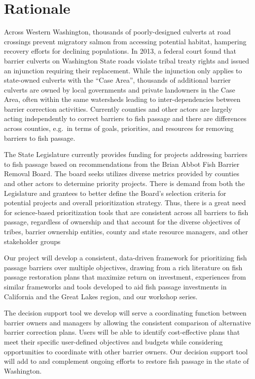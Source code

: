 \documentclass[12pt]{elsarticle}
\begin{document}
		\section{Rationale}
			Across Western Washington, thousands of poorly-designed culverts at road crossings prevent migratory salmon from accessing potential habitat, hampering recovery efforts for declining populations. In 2013, a federal court found that barrier culverts on Washington State roads violate tribal treaty rights and issued an injunction requiring their replacement. While the injunction only applies to state-owned culverts with the ``Case Area'', thousands of additional barrier culverts are owned by local governments and private landowners in the Case Area, often within the same watersheds leading to inter-dependencies between barrier correction activities. Currently counties and other actors are largely acting independently to correct barriers to fish passage and there are differences across counties, e.g.\, in terms of goals, priorities, and resources for removing barriers to fish passage. 
			
			The State Legislature currently provides funding for projects addressing barriers to fish passage based on recommendations from the Brian Abbot Fish Barrier Removal Board. The board seeks utilizes diverse metrics provided by counties and other actors to determine priority projects. There is demand from both the Legislature and grantees to better define the Board's selection criteria for potential projects and overall prioritization strategy. Thus, there is a great need for science-based prioritization tools that are consistent across all barriers to fish passage, regardless of ownership and that account for the diverse objectives of tribes, barrier ownership entities, county and state resource managers, and other stakeholder groups
			
			Our project will develop a consistent, data-driven framework for prioritizing fish passage barriers over multiple objectives, drawing from a rich literature on fish passage restoration plans that maximize return on investment, experiences from similar frameworks and tools developed to aid fish passage investments in California and the Great Lakes region, and our workshop series. 
			
			The decision support tool we develop will serve a coordinating function between barrier owners and managers by allowing the consistent comparison of alternative barrier correction plans. Users will be able to identify cost-effective plans that meet their specific user-defined objectives and budgets while considering opportunities to coordinate with other barrier owners. Our decision support tool will add to and complement ongoing efforts to restore fish passage in the state of Washington.
			
			
			
\end{document}

